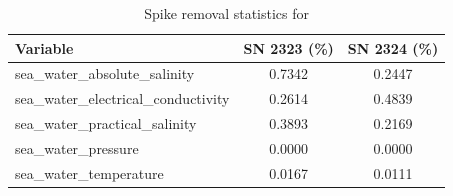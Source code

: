\begin{table}[h]
\centering
\caption{Spike removal statistics for \projectname{} \casenumber{}}
\label{tab:spike_stats}
\begin{tabular}{|l|c|c|}
\hline
Variable & SN 2323 (\%) & SN 2324 (\%) \\
\hline
sea\_water\_absolute\_salinity & 0.7342 & 0.2447 \\
sea\_water\_electrical\_conductivity & 0.2614 & 0.4839 \\
sea\_water\_practical\_salinity & 0.3893 & 0.2169 \\
sea\_water\_pressure & 0.0000 & 0.0000 \\
sea\_water\_temperature & 0.0167 & 0.0111 \\
\hline
\end{tabular}
\end{table}

